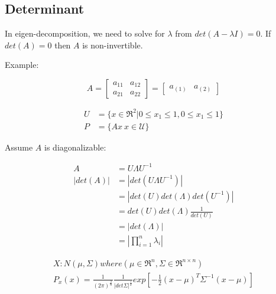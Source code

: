 \subsection{Determinant}

In eigen-decomposition, we need to solve for $\lambda$ from $det(A - \lambda I) = 0$. 
If $det(A) = 0$ then $A$ is non-invertible. 

Example:

$$A = 
\left[
\begin{matrix}
a_{11} & a_{12}\\
a_{21} & a_{22}
\end{matrix}
\right] =
\left[
\begin{matrix}
a_{(1)} & a_{(2)}
\end{matrix}
\right]
$$

\begin{align*}
U &= \{x\in \Re^2 | 0\leq x_1 \leq 1, 0\leq x_1 \leq 1 \}\\
P &= \{Ax \ x\in \mathcal{U}\} 
\end{align*}



Assume $A$ is diagonalizable:

\begin{align*}
A &= U\Lambda U^{-1}\\
|det(A)| &= |det(U\Lambda U^{-1})| \\
&= |det(U)det(\Lambda)det(U^{-1})|\\
&= det(U)det(\Lambda)\frac{1}{det(U)}\\
&= |det(\Lambda)|\\
&= |\prod^n_{i=1}\lambda_i|
\end{align*}

\begin{align*}
X: N(\mu, \Sigma)where(\mu \in \Re^n, \Sigma \in \Re^{n\times n})\\
P_x(x) = \frac{1}{(2\pi)^{\frac{2}{n}}}\frac{1}{|det\Sigma|^{\frac{1}{2}}}exp[-\frac{1}{2}(x - \mu)^T\Sigma^{-1}(x - \mu)]
\end{align*}

